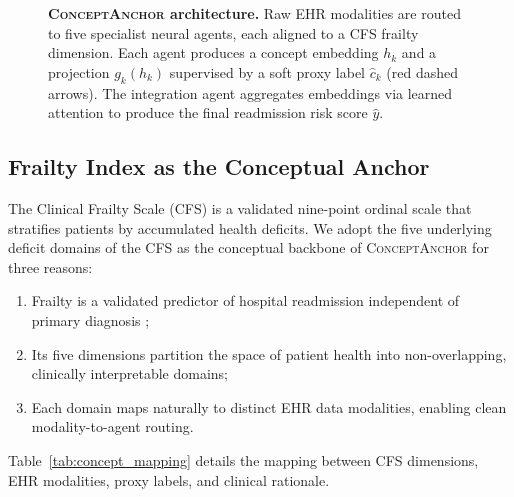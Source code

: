 \documentclass[review,12pt,authoryear]{elsarticle}
\newcommand{\modelname}{\textsc{ConceptAnchor}}
\begin{document}
\begin{figure}[t]
\begin{tikzpicture}
  \end{tikzpicture}
  \caption{\textbf{\modelname{} architecture.}
  Raw EHR modalities are routed to five specialist neural agents, each aligned to a CFS frailty dimension.
  Each agent produces a concept embedding $h_k$ and a projection $g_k(h_k)$ supervised by a soft proxy label $\hat{c}_k$ (red dashed arrows).
  The integration agent aggregates embeddings via learned attention to produce the final readmission risk score $\hat{y}$.}
  \label{fig:architecture}
\end{figure}

\subsection{Frailty Index as the Conceptual Anchor}

The Clinical Frailty Scale (CFS) \citep{rockwood2005frailty} is a validated nine-point ordinal scale that stratifies patients by accumulated health deficits.
We adopt the five underlying deficit domains of the CFS as the conceptual backbone of \modelname{} for three reasons:
\begin{enumerate}[leftmargin=*, label=(\roman*), noitemsep]
  \item Frailty is a validated predictor of hospital readmission independent of primary diagnosis \citep{stow2019predicting};
  \item Its five dimensions partition the space of patient health into non-overlapping, clinically interpretable domains;
  \item Each domain maps naturally to distinct EHR data modalities, enabling clean modality-to-agent routing.
\end{enumerate}

Table~\ref{tab:concept_mapping} details the mapping between CFS dimensions, EHR modalities, proxy labels, and clinical rationale.
\end{document}
